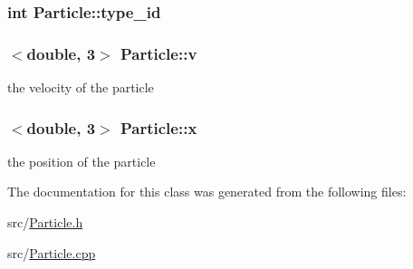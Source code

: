 \subsubsection[{\texorpdfstring{type\+\_\+id}{type_id}}]{\setlength{\rightskip}{0pt plus 5cm}int Particle\+::type\+\_\+id\hspace{0.3cm}{\ttfamily [private]}}\hypertarget{classParticle_ab532eb4253f0ab3b3e7ac1cb0257b3de}{}\label{classParticle_ab532eb4253f0ab3b3e7ac1cb0257b3de}
\subsubsection[{\texorpdfstring{v}{v}}]{$<$double, 3$>$ Particle\+::v\hspace{0.3cm}{\ttfamily [private]}}\hypertarget{classParticle_ac3669e50d83d8608d522965b9acd1d8b}{}\label{classParticle_ac3669e50d83d8608d522965b9acd1d8b}
the velocity of the particle 
\subsubsection[{\texorpdfstring{x}{x}}]{$<$double, 3$>$ Particle\+::x\hspace{0.3cm}{\ttfamily [private]}}\hypertarget{classParticle_a3789900d6fe19a75d3a82cd5e9622c4c}{}\label{classParticle_a3789900d6fe19a75d3a82cd5e9622c4c}
the position of the particle 

The documentation for this class was generated from the following files\+:\begin{DoxyCompactItemize}
\item 
src/\hyperlink{Particle_8h}{Particle.\+h}\item 
src/\hyperlink{Particle_8cpp}{Particle.\+cpp}\end{DoxyCompactItemize}

